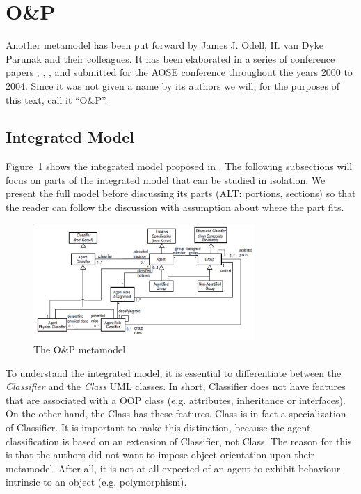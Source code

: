 \section{O\&P}

Another metamodel has been put forward by James J. Odell, H. van Dyke Parunak and their colleagues.
It has been elaborated in a series of conference papers \cite{Odell01}, \cite{Parunak02}, \cite{Odell03}, \cite{Odell04} and \cite{Odell05} submitted for the AOSE conference throughout the years 2000 to 2004.
Since it was not given a name by its authors we will, for the purposes of this text, call it ``O\&P''.

\subsection{Integrated Model}

Figure~\ref{figure:onp-metamodel} shows the integrated model proposed in \cite{Odell05}.
The following subsections will focus on parts of the integrated model that can be studied in isolation.
We present the full model before discussing its parts (ALT: portions, sections) so that the reader can follow the discussion with assumption about where the part fits.

\begin{figure}[h]
	\centering
	\includegraphics[width=0.75\textwidth]{images/onp-metamodel.png}
	\caption{The O\&P metamodel}
	\label{figure:onp-metamodel}
\end{figure}

To understand the integrated model, it is essential to differentiate between the \textit{Classifier} and the \textit{Class} UML classes.
In short, Classifier does not have features that are associated with a OOP class (e.g. attributes, inheritance or interfaces).
On the other hand, the Class has these features.
Class is in fact a specialization of Classifier.
It is important to make this distinction, because the agent classification is based on an extension of Classifier, not Class.
The reason for this is that the authors did not want to impose object-orientation upon their metamodel.
After all, it is not at all expected of an agent to exhibit behaviour intrinsic to an object (e.g. polymorphism). 

